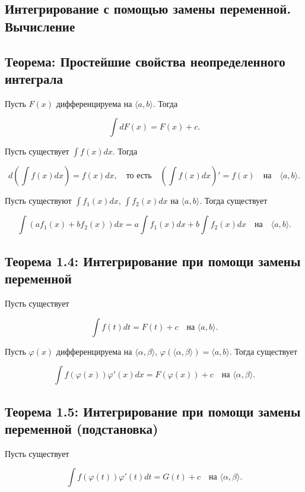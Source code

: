 {
\subsection{Интегрирование с помощью замены переменной. Вычисление }
\subsection*{Теорема: Простейшие свойства неопределенного интеграла}

Пусть \( F(x) \) дифференцируема на \( \langle a, b \rangle \). Тогда 


\[
\int dF(x) = F(x) + c.
\]



Пусть существует \( \int f(x)dx \). Тогда 


\[
d\left(\int f(x)dx\right) = f(x)dx, \quad \text{то есть} \quad \left(\int f(x)dx\right)' = f(x) \quad \text{на} \quad \langle a, b \rangle.
\]



Пусть существуют \( \int f_1(x)dx \), \( \int f_2(x)dx \) на \( \langle a, b \rangle \). Тогда существует 


\[
\int (a f_1(x) + b f_2(x))dx = a \int f_1(x)dx + b \int f_2(x)dx \quad \text{на} \quad \langle a, b \rangle.
\]

\subsection*{Теорема 1.4: Интегрирование при помощи замены переменной}

Пусть существует


\[
\int f(t) dt = F(t) + c \quad \text{на } \langle a, b \rangle.
\]



Пусть \( \varphi(x) \) дифференцируема на \( \langle \alpha, \beta \rangle \), \( \varphi(\langle \alpha, \beta \rangle) = \langle a, b \rangle \). Тогда существует


\[
\int f(\varphi(x)) \varphi'(x) dx = F(\varphi(x)) + c \quad \text{на } \langle \alpha, \beta \rangle.
\]

\subsection*{Теорема 1.5: Интегрирование при помощи замены переменной (подстановка)}

Пусть существует


\[
\int f(\varphi(t)) \varphi'(t) dt = G(t) + c \quad \text{на } \langle \alpha, \beta \rangle.
\]



}
